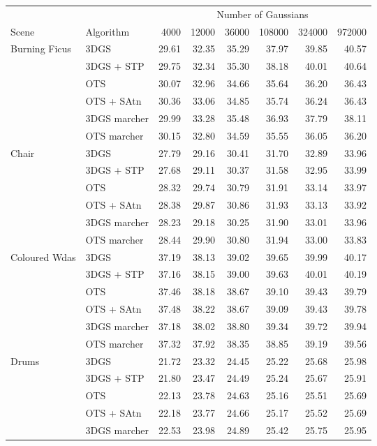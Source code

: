 \begin{longtable}[H]{llrrrrrr}
\toprule
& & \multicolumn{6}{c}{Number of Gaussians} \\
Scene & Algorithm & 4000 & 12000 & 36000 & 108000 & 324000 & 972000 \\
\midrule \endhead
Burning Ficus & 3DGS & 29.61 & 32.35 & 35.29 & 37.97 & 39.85 & 40.57 \\
 & 3DGS + STP & 29.75 & 32.34 & 35.30 & 38.18 & 40.01 & 40.64 \\
 & OTS & 30.07 & 32.96 & 34.66 & 35.64 & 36.20 & 36.43 \\
 & OTS + SAtn & 30.36 & 33.06 & 34.85 & 35.74 & 36.24 & 36.43 \\
 & 3DGS marcher & 29.99 & 33.28 & 35.48 & 36.93 & 37.79 & 38.11 \\
 & OTS marcher & 30.15 & 32.80 & 34.59 & 35.55 & 36.05 & 36.20 \\
Chair & 3DGS & 27.79 & 29.16 & 30.41 & 31.70 & 32.89 & 33.96 \\
 & 3DGS + STP & 27.68 & 29.11 & 30.37 & 31.58 & 32.95 & 33.99 \\
 & OTS & 28.32 & 29.74 & 30.79 & 31.91 & 33.14 & 33.97 \\
 & OTS + SAtn & 28.38 & 29.87 & 30.86 & 31.93 & 33.13 & 33.92 \\
 & 3DGS marcher & 28.23 & 29.18 & 30.25 & 31.90 & 33.01 & 33.96 \\
 & OTS marcher & 28.44 & 29.90 & 30.80 & 31.94 & 33.00 & 33.83 \\
Coloured Wdas & 3DGS & 37.19 & 38.13 & 39.02 & 39.65 & 39.99 & 40.17 \\
 & 3DGS + STP & 37.16 & 38.15 & 39.00 & 39.63 & 40.01 & 40.19 \\
 & OTS & 37.46 & 38.18 & 38.67 & 39.10 & 39.43 & 39.79 \\
 & OTS + SAtn & 37.48 & 38.22 & 38.67 & 39.09 & 39.43 & 39.78 \\
 & 3DGS marcher & 37.18 & 38.02 & 38.80 & 39.34 & 39.72 & 39.94 \\
 & OTS marcher & 37.32 & 37.92 & 38.35 & 38.85 & 39.19 & 39.56 \\
Drums & 3DGS & 21.72 & 23.32 & 24.45 & 25.22 & 25.68 & 25.98 \\
 & 3DGS + STP & 21.80 & 23.47 & 24.49 & 25.24 & 25.67 & 25.91 \\
 & OTS & 22.13 & 23.78 & 24.63 & 25.16 & 25.51 & 25.69 \\
 & OTS + SAtn & 22.18 & 23.77 & 24.66 & 25.17 & 25.52 & 25.69 \\
 & 3DGS marcher & 22.53 & 23.98 & 24.89 & 25.42 & 25.75 & 25.95 \\

\end{longtable}

